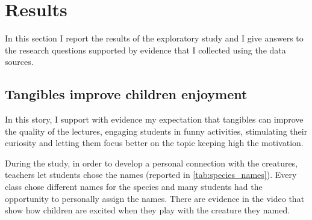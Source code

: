\section{Results}
In this section I report the results of the exploratory study and I give answers to the research questions supported by evidence that I collected using the data sources.

\subsection{Tangibles improve children enjoyment}
In this story, I support with evidence my expectation that tangibles can improve the quality of the lectures, engaging students in funny activities, stimulating their curiosity and letting them focus better on the topic keeping high the motivation.

During the study, in order to develop a personal connection with the creatures, teachers let students chose the names (reported in \ref{tab:species_names}). Every class chose different names for the species and many students had the opportunity to personally assign the names. There are evidence in the video that show how children are excited when they play with the creature they named.

